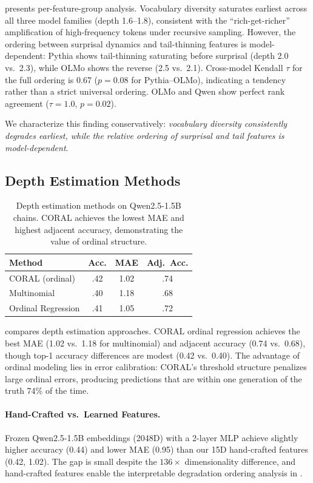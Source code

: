 \documentclass[11pt,a4paper]{article}
\begin{document}
 presents per-feature-group analysis. Vocabulary diversity saturates earliest across all three model families (depth 1.6--1.8), consistent with the ``rich-get-richer'' amplification of high-frequency tokens under recursive sampling. However, the ordering between surprisal dynamics and tail-thinning features is model-dependent: Pythia shows tail-thinning saturating before surprisal (depth 2.0 vs.\ 2.3), while OLMo shows the reverse (2.5 vs.\ 2.1). Cross-model Kendall $\tau$ for the full ordering is 0.67 ($p=0.08$ for Pythia--OLMo), indicating a tendency rather than a strict universal ordering. OLMo and Qwen show perfect rank agreement ($\tau=1.0$, $p=0.02$).

We characterize this finding conservatively: \emph{vocabulary diversity consistently degrades earliest, while the relative ordering of surprisal and tail features is model-dependent}.

\subsection{Depth Estimation Methods}

\begin{table}[t]
\centering
\small
\begin{tabular}{lccc}
\toprule
\textbf{Method} & \textbf{Acc.} & \textbf{MAE} & \textbf{Adj.\ Acc.} \\
\midrule
CORAL (ordinal) & .42 & 1.02 & .74 \\
Multinomial & .40 & 1.18 & .68 \\
Ordinal Regression & .41 & 1.05 & .72 \\
\bottomrule
\end{tabular}
\caption{Depth estimation methods on Qwen2.5-1.5B chains. CORAL achieves the lowest MAE and highest adjacent accuracy, demonstrating the value of ordinal structure.}
\label{tab:ordinal}
\end{table}

 compares depth estimation approaches. CORAL ordinal regression achieves the best MAE (1.02 vs.\ 1.18 for multinomial) and adjacent accuracy (0.74 vs.\ 0.68), though top-1 accuracy differences are modest (0.42 vs.\ 0.40). The advantage of ordinal modeling lies in error calibration: CORAL's threshold structure penalizes large ordinal errors, producing predictions that are within one generation of the truth 74\% of the time.

\paragraph{Hand-Crafted vs.\ Learned Features.} Frozen Qwen2.5-1.5B embeddings (2048D) with a 2-layer MLP achieve slightly higher accuracy (0.44) and lower MAE (0.95) than our 15D hand-crafted features (0.42, 1.02). The gap is small despite the $136\times$ dimensionality difference, and hand-crafted features enable the interpretable degradation ordering analysis in .
\end{document}
